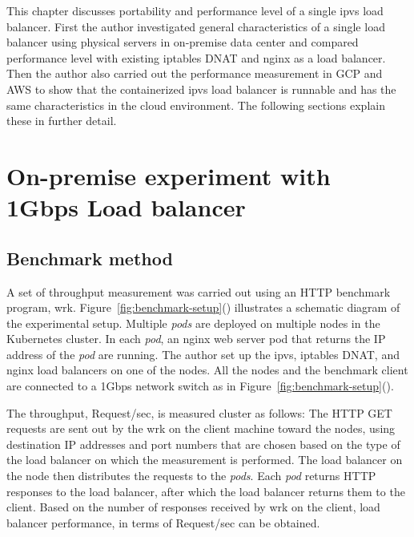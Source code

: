 This chapter discusses portability and performance level of a single ipvs load balancer.
First the author investigated general characteristics of a single load balancer using physical servers in on-premise data center and compared performance level with existing iptables DNAT and nginx as a load balancer.
Then the author also carried out the performance measurement in GCP and AWS to show that the containerized ipvs load balancer is runnable and has the same characteristics in the cloud environment.
The following sections explain these in further detail.

\section{On-premise experiment with 1Gbps Load balancer}
\subsection{Benchmark method}

A set of throughput measurement was carried out using an HTTP benchmark program, wrk\cite{Glozer2016}.
Figure~\ref{fig:benchmark-setup}() illustrates a schematic diagram of the experimental setup.
Multiple {\em pods} are deployed on multiple nodes in the Kubernetes cluster. 
In each {\em pod}, an nginx web server pod that returns the IP address of the {\em pod} are running.
The author set up the ipvs, iptables DNAT, and nginx load balancers on one of the nodes.
All the nodes and the benchmark client are connected to a 1Gbps network switch as in Figure~\ref{fig:benchmark-setup}().

The throughput, Request/sec, is measured cluster as follows:
The HTTP GET requests are sent out by the wrk on the client machine toward the nodes,
using destination IP addresses and port numbers that are chosen based on the type of the load balancer on which the measurement is performed.
The load balancer on the node then distributes the requests to the {\em pods}.
Each {\em pod} returns HTTP responses to the load balancer, after which the load balancer returns them to the client.
Based on the number of responses received by wrk on the client, 
load balancer performance, in terms of Request/sec can be obtained. 

